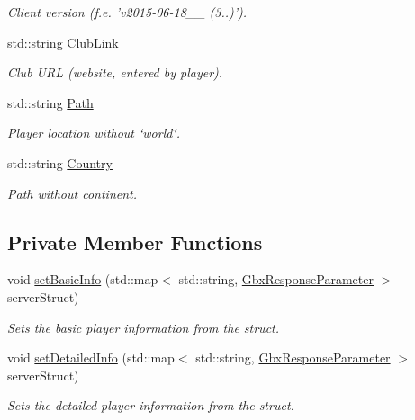 \begin{DoxyCompactItemize}
\begin{DoxyCompactList}\small\item\em Client version (f.\-e. 'v2015-\/06-\/18\-\_\-\_ (3..)'). \end{DoxyCompactList}\item 
\hypertarget{structPlayer_af6acb51bf731275d73aa6cc55a8255a8}{std\-::string \hyperlink{structPlayer_af6acb51bf731275d73aa6cc55a8255a8}{Club\-Link}}\label{structPlayer_af6acb51bf731275d73aa6cc55a8255a8}

\begin{DoxyCompactList}\small\item\em Club U\-R\-L (website, entered by player). \end{DoxyCompactList}\item 
\hypertarget{structPlayer_a3da038886ddd825ebc9612b460ecd008}{std\-::string \hyperlink{structPlayer_a3da038886ddd825ebc9612b460ecd008}{Path}}\label{structPlayer_a3da038886ddd825ebc9612b460ecd008}

\begin{DoxyCompactList}\small\item\em \hyperlink{structPlayer}{Player} location without \char`\"{}world\char`\"{}. \end{DoxyCompactList}\item 
\hypertarget{structPlayer_aa04503994922157165081fa29bf4729d}{std\-::string \hyperlink{structPlayer_aa04503994922157165081fa29bf4729d}{Country}}\label{structPlayer_aa04503994922157165081fa29bf4729d}

\begin{DoxyCompactList}\small\item\em Path without continent. \end{DoxyCompactList}\end{DoxyCompactItemize}
\subsection*{Private Member Functions}
\begin{DoxyCompactItemize}
\item 
void \hyperlink{structPlayer_ac4666bfba77342a37f3ab3628b26acd0}{set\-Basic\-Info} (std\-::map$<$ std\-::string, \hyperlink{classGbxResponseParameter}{Gbx\-Response\-Parameter} $>$ server\-Struct)
\begin{DoxyCompactList}\small\item\em Sets the basic player information from the struct. \end{DoxyCompactList}\item 
void \hyperlink{structPlayer_a179183e86a0b9a4b808593be96d65391}{set\-Detailed\-Info} (std\-::map$<$ std\-::string, \hyperlink{classGbxResponseParameter}{Gbx\-Response\-Parameter} $>$ server\-Struct)
\begin{DoxyCompactList}\small\item\em Sets the detailed player information from the struct. \end{DoxyCompactList}\end{DoxyCompactItemize}


